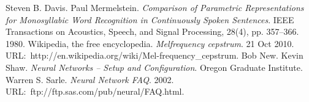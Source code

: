 \documentclass[10pt,a4paper,twocolumn]{article}
\begin{document}
\vfill
\begin{thebibliography}{9}
   Steven B. Davis. Paul Mermelstein.
                 \emph{Comparison of Parametric Representations for Monosyllabic Word Recognition in Continuously Spoken Sentences}.
                 IEEE Transactions on Acoustics, Speech, and Signal Processing, 28(4), pp. 357–366. 1980.
   Wikipedia, the free encyclopedia. \emph{Mel\discretionary{-}{-}{-}frequency cepstrum}. 21 Oct 2010. URL:~http://en.wikipedia.org/wiki/Mel-frequency\_cepstrum.
   Bob New. Kevin Shaw. \emph{Neural Networks -- Setup and Configuration}. Oregon Graduate Institute.
   Warren S. Sarle. \emph{Neural Network FAQ}. 2002. URL:~ftp://ftp.sas.com/pub/neural/FAQ.html.
\end{thebibliography}

\newpage
\appendix
\end{document}
